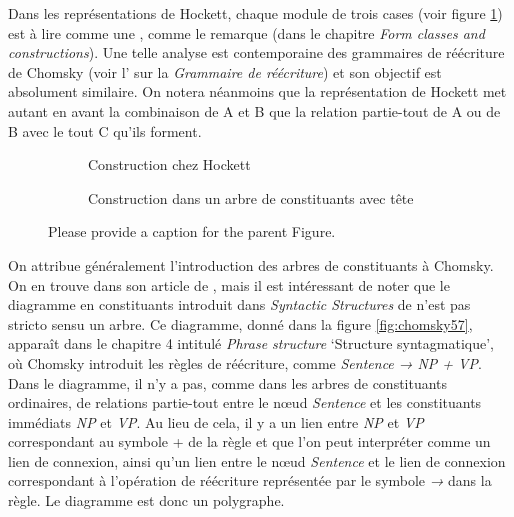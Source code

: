 { 
    Dans les représentations de Hockett, chaque module de trois cases (voir figure \ref{fig:hockett3}) est à lire comme une , comme le remarque \citet{hockett1958course} (dans le chapitre \textit{Form classes and constructions}). Une telle analyse est contemporaine des grammaires de réécriture de Chomsky (voir l’ sur la \textit{Grammaire de réécriture}) et son objectif est absolument similaire. On notera néanmoins que la représentation de Hockett met autant en avant la combinaison de A et B que la relation partie-tout de A ou de B avec le tout C qu’ils forment.

    \begin{figure}[H]
    \begin{subfigure}[t]{.5\textwidth}\centering
    \caption{Construction chez Hockett}
    \end{subfigure}\begin{subfigure}[t]{.5\textwidth}\centering
        \caption{Construction dans un arbre de constituants avec tête}
    \end{subfigure}
    \caption{{\color{red}Please provide a caption for the parent Figure.}\label{fig:hockett3}}
    \end{figure}   

    On attribue généralement l’introduction des arbres de constituants à Chomsky. On en trouve dans son article de \citeyear{chomsky1955three}, mais il est intéressant de noter que le diagramme en constituants introduit dans \textit{Syntactic Structures} de \citeyear{chomsky1957syntactic} n’est pas stricto sensu un arbre. Ce diagramme, donné dans la figure \ref{fig:chomsky57}, apparaît dans le chapitre 4 intitulé \textit{Phrase structure} ‘Structure syntagmatique’, où Chomsky introduit les règles de réécriture, comme \textit{Sentence → NP + VP}. Dans le diagramme, il n’y a pas, comme dans les arbres de constituants ordinaires, de relations partie-tout entre le nœud \textit{Sentence} et les constituants immédiats \textit{NP} et \textit{VP}. Au lieu de cela, il y a un lien entre \textit{NP} et \textit{VP} correspondant au symbole + de la règle et que l’on peut interpréter comme un lien de connexion, ainsi qu’un lien entre le nœud \textit{Sentence} et le lien de connexion correspondant à l’opération de réécriture représentée par le symbole \textit{→} dans la règle. Le diagramme est donc un polygraphe.

}
